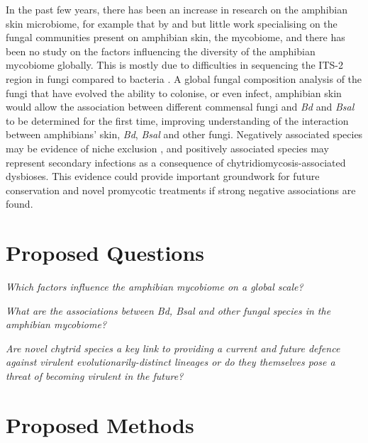 \documentclass[11pt, a4paper, titlepage]{article}
\begin{document}
\noindent In the past few years, there has been an increase in research on the amphibian skin microbiome, for example that by \parencite{Bates2018} and \parencite{Bates2019} but little work specialising on the fungal communities present on amphibian skin, the mycobiome, and there has been no study on the factors influencing the diversity of the amphibian mycobiome globally. This is mostly due to difficulties in sequencing the ITS-2 region in fungi compared to bacteria \parencite{Tipton2017}. A global fungal composition analysis of the fungi that have evolved the ability to colonise, or even infect, amphibian skin would allow the association between different commensal fungi and \textit{Bd} and \textit{Bsal} to be determined for the first time, improving understanding of the interaction between amphibians' skin, \textit{Bd}, \textit{Bsal} and other fungi. Negatively associated species may be evidence of niche exclusion \parencite{Hardin1960}, and positively associated species may represent secondary infections as a consequence of chytridiomycosis-associated dysbioses. This evidence could provide important groundwork for future conservation and novel promycotic treatments if strong negative associations are found.

\section{Proposed Questions}

\begin{list}{}{\leftmargin=1em}
	 \item \textit{Which factors influence the amphibian mycobiome on a global scale?}
	
	\item \textit{What are the associations between \textit{Bd}, \textit{Bsal} and other fungal species in the amphibian mycobiome?}
	
	\item \textit{Are novel chytrid species a key link to providing a current and future defence against virulent evolutionarily-distinct lineages or do they themselves pose a threat of becoming virulent in the future?} 
\end{list}
	
\section{Proposed Methods}
\end{document}
